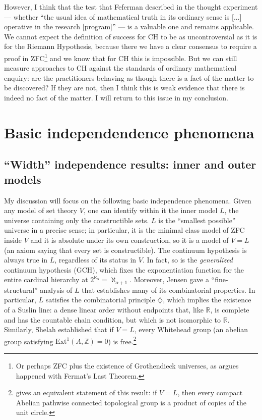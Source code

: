 \documentclass[letterpaper,12pt]{article}
\newcommand{\Z}{\mathbb{Z}}
\begin{document}
However, I think that the test that Feferman described in the thought experiment --- whether ``the usual idea of mathematical truth in its ordinary sense is [...] operative in the research [program]'' --- is a valuable one and remains applicable. We cannot expect the definition of success for CH to be as uncontroversial as it is for the Riemann Hypothesis, because there we have a clear consensus to require a proof in ZFC\footnote{Or perhaps ZFC plus the existence of Grothendieck universes, as \cite{mclarty2010flt} argues happened with Fermat's Last Theorem.} and we know that for CH this is impossible. But we can still measure approaches to CH against the standards of ordinary mathematical enquiry: are the practitioners behaving as though there is a fact of the matter to be discovered? If they are not, then I think this is weak evidence that there is indeed no fact of the matter. I will return to this issue in my conclusion.

\section{Basic independendence phenomena}
\subsection{``Width'' independence results: inner and outer models}
\label{width}
My discussion will focus on the following basic independence phenomena. Given any model of set theory $V$, one can identify within it the inner model $L$, the universe containing only the constructible sets. $L$ is the ``smallest possible'' universe in a precise sense; in particular, it is the minimal class model of ZFC inside $V$ and it is absolute under its own construction, so it is a model of $V=L$ (an axiom saying that every set is constructible). The continuum hypothesis is always true in $L$, regardless of its status in $V$. In fact, so is the \emph{generalized} continuum hypothesis (GCH), which fixes the exponentiation function for the entire cardinal hierarchy at $2^{\aleph_\alpha} = \aleph_{\alpha + 1}$. Moreover, Jensen gave a ``fine-structural'' analysis of $L$ that establishes many of its combinatorial properties. In particular, $L$ satisfies the combinatorial principle $\diamondsuit$, which implies the existence of a Suslin line: a dense linear order without endpoints that, like $\mathbb{R}$, is complete and has the countable chain condition, but which is not isomorphic to $\mathbb{R}$. Similarly, Shelah established that if $V = L$, every Whitehead group (an abelian group satisfying $\mathrm{Ext}^1(A, \Z) = 0$) is free.\footnote{\cite{magidor2012some} gives an equivalent statement of this result: if $V=L$, then every compact Abelian pathwise connected topological group is a product of copies of the unit circle.}
\end{document}
